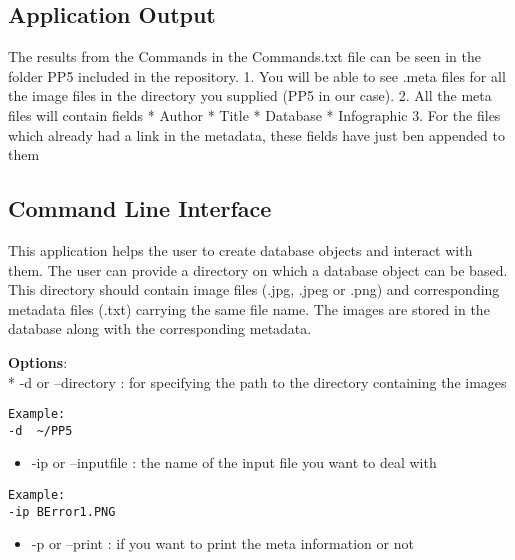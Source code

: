 \hypertarget{application-output}{%
\subsection{Application Output}\label{application-output}}

The results from the Commands in the Commands.txt file can be seen in
the folder PP5 included in the repository. 1. You will be able to see
.meta files for all the image files in the directory you supplied (PP5
in our case). 2. All the meta files will contain fields * Author * Title
* Database * Infographic 3. For the files which already had a link in
the metadata, these fields have just ben appended to them

\hypertarget{command-line-interface}{%
\subsection{Command Line Interface}\label{command-line-interface}}

This application helps the user to create database objects and interact
with them. The user can provide a directory on which a database object
can be based. This directory should contain image files (.jpg, .jpeg or
.png) and corresponding metadata files (.txt) carrying the same file
name. The images are stored in the database along with the corresponding
metadata.

\textbf{Options}:\\
* -d or --directory : for specifying the path to the directory
containing the images

\begin{verbatim}
Example: 
-d  ~/PP5
\end{verbatim}

\begin{itemize}
\tightlist
\item
   -ip or --inputfile : the name of the input file you want to deal with
  \\
\end{itemize}

\begin{verbatim}
Example: 
-ip BError1.PNG
\end{verbatim}

\begin{itemize}
\tightlist
\item
   -p or --print : if you want to print the meta information or not \\
\end{itemize}

